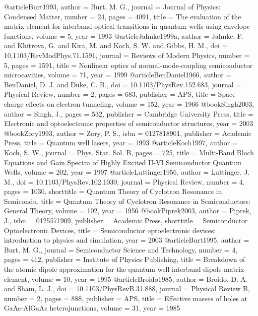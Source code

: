 @article{Burt1993,
author = {Burt, M. G.},
journal = {Journal of Physics: Condensed Matter},
number = {24},
pages = {4091},
title = {{The evaluation of the matrix element for interband optical transitions in quantum wells using envelope functions}},
volume = {5},
year = {1993}
}
@article{Jahnke1999a,
author = {Jahnke, F. and Khitrova, G. and Kira, M. and Koch, S. W. and Gibbs, H. M.},
doi = {10.1103/RevModPhys.71.1591},
journal = {Reviews of Modern Physics},
number = {5},
pages = {1591},
title = {{Nonlinear optics of normal-mode-coupling semiconductor microcavities}},
volume = {71},
year = {1999}
}
@article{BenDaniel1966,
author = {BenDaniel, D. J. and Duke, C. B.},
doi = {10.1103/PhysRev.152.683},
journal = {Physical Review},
number = {2},
pages = {683},
publisher = {APS},
title = {{Space-charge effects on electron tunneling}},
volume = {152},
year = {1966}
}
@book{Singh2003,
author = {Singh, J.},
pages = {532},
publisher = {Cambridge University Press},
title = {{Electronic and optoelectronic properties of semiconductor structures}},
year = {2003}
}
@book{Zory1993,
author = {Zory, P. S.},
isbn = {0127818901},
publisher = {Academic Press},
title = {{Quantum well lasers}},
year = {1993}
}
@article{Koch1997,
author = {Koch, S. W.},
journal = {Phys. Stat. Sol. B},
pages = {725},
title = {{Multi-Band Bloch Equations and Gain Spectra of Highly Excited II-VI Semiconductor Quantum Wells}},
volume = {202},
year = {1997}
}
@article{Luttinger1956,
author = {Luttinger, J. M.},
doi = {10.1103/PhysRev.102.1030},
journal = {Physical Review},
number = {4},
pages = {1030},
shorttitle = {Quantum Theory of Cyclotron Resonance in Semicondu},
title = {{Quantum Theory of Cyclotron Resonance in Semiconductors: General Theory}},
volume = {102},
year = {1956}
}
@book{Piprek2003,
author = {Piprek, J.},
isbn = {0125571909},
publisher = {Academic Press},
shorttitle = {Semiconductor Optoelectronic Devices},
title = {{Semiconductor optoelectronic devices: introduction to physics and simulation}},
year = {2003}
}
@article{Burt1995,
author = {Burt, M. G.},
journal = {Semiconductor Science and Technology},
number = {4},
pages = {412},
publisher = {Institute of Physics Publishing},
title = {{Breakdown of the atomic dipole approximation for the quantum well interband dipole matrix element}},
volume = {10},
year = {1995}
}
@article{Broido1985,
author = {Broido, D. A. and Sham, L. J.},
doi = {10.1103/PhysRevB.31.888},
journal = {Physical Review B},
number = {2},
pages = {888},
publisher = {APS},
title = {{Effective masses of holes at GaAs-AlGaAs heterojunctions}},
volume = {31},
year = {1985}
}
